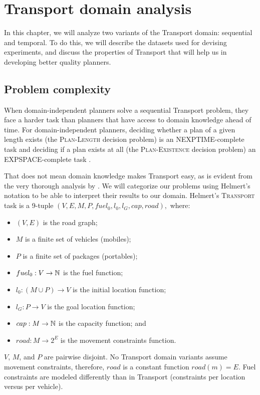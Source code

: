 \chapter{Transport domain analysis}

In this chapter, we will analyze two variants of the Transport domain: sequential and temporal. To do this, we will describe the datasets
used for devising experiments, and discuss the properties of Transport
that will help us in developing better quality planners.

\section{Problem complexity}

When domain-independent planners solve a sequential Transport problem,
they face a harder task than planners that have access to domain knowledge ahead of time.
For domain-independent planners, deciding whether a plan of a given length exists
(the \textsc{Plan-Length} decision problem) is
an NEXPTIME-complete task
and deciding if a plan exists at all (the \textsc{Plan-Existence} decision problem)
an EXPSPACE-complete task \citep[Table~3.2]{Ghallab2004}.

That does not mean domain knowledge makes Transport easy, as is evident from
the very thorough analysis by \citet{Helmert2001, Helmert2001a}.
We will categorize our problems using Helmert's notation to
be able to interpret their results to our domain.
Helmert's \textsc{Transport} task is a 9-tuple $(V, E, M, P, fuel_0, l_0, l_G, cap, road),$
where:
\begin{itemize}
\item $(V, E)$ is the road graph;
\item $M$ is a finite set of vehicles (mobiles);
\item $P$ is a finite set of packages (portables);
\item $fuel_0 : V \to \mathbb{N}$ is the fuel function;
\item $l_0: (M \cup P) \to V$ is the initial location function;
\item $l_G: P \to V$ is the goal location function;
\item $cap: M \to \mathbb{N}$ is the capacity function; and
\item $road: M \to 2^E$ is the movement constraints function.
\end{itemize}
$V$, $M$, and $P$ are pairwise disjoint.
No Transport domain variants assume movement constraints, therefore, $road$ is a constant
function $road(m) = E$.
Fuel constraints are modeled differently than in Transport (constraints per location versus per vehicle). 

